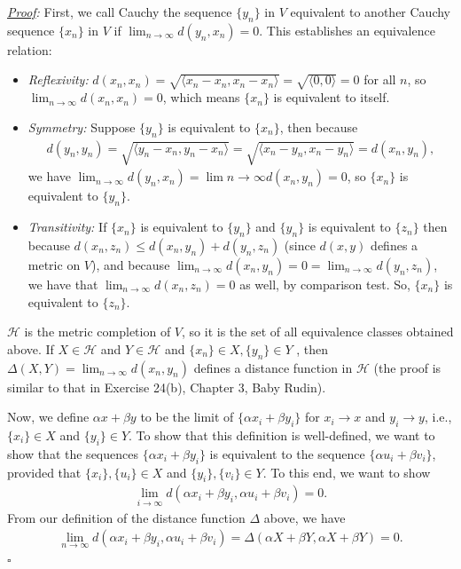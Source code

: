 \documentclass[11pt]{article}
\begin{document}
\begin{enumerate}[(a)]
\begin{itemize}
		
		\noindent \textit{\underline{Proof}:} First, we call Cauchy the sequence $\{y_n\}$ in $V$ equivalent to another Cauchy sequence $\{x_n\}$ in $V$ if $ \lim_{n\to \infty}d(y_n,x_n) =0$. This establishes an equivalence relation:
		\begin{itemize}
			\item \textit{Reflexivity:} $d(x_n,x_n) = \sqrt{\langle x_n-x_n,x_n-x_n\rangle} = \sqrt{\langle 0,0 \rangle} =0$ for all $n$, so $\lim_{n\to \infty} d(x_n,x_n) = 0$, which means $\{x_n\}$ is equivalent to itself. 
			\item \textit{Symmetry:} Suppose $\{y_n\}$ is equivalent to $\{x_n\}$, then because 
			\begin{align*}
			d(y_n,y_n) = \sqrt{\langle y_n -x_n, y_n-x_n\rangle} = \sqrt{\langle x_n-y_n, x_n-y_n \rangle} = d(x_n,y_n),
			\end{align*}
			we have $\lim_{n\to \infty} d(y_n,x_n) = \lim{n\to \infty} d(x_n,y_n) = 0$, so $\{x_n\}$ is equivalent to $\{y_n\}$. 
			\item \textit{Transitivity:} If $\{x_n\}$ is equivalent to $\{y_n\}$ and $\{y_n\}$ is equivalent to $\{z_n\}$ then because $
			d(x_n,z_n) \leq d(x_n,y_n) + d(y_n , z_n)$
			(since $d(x,y)$ defines a metric on $V$), and because $\lim_{n\to \infty}d(x_n,y_n) = 0 = \lim_{n\to\infty}d(y_n,z_n)$, we have that $\lim_{n\to \infty}d(x_n,z_n) = 0$ as well, by comparison test. So, $\{x_n\}$ is equivalent to $\{z_n\}$.   
		\end{itemize}
		$\mathcal{H}$ is the metric completion of $V$, so it is the set of all equivalence classes obtained above. If $X \in \mathcal{H}$ and $Y\in \mathcal{H}$ and $\{x_n\} \in X, \{y_n\}\in Y$ , then $
		\Delta (X,Y) = \lim_{n\to \infty}d(x_n,y_n)$ defines a distance function in $\mathcal{H}$ (the proof is similar to that in Exercise 24(b), Chapter 3, Baby Rudin).
		
		Now, we define $\alpha x + \beta y$ to be the limit of $\{\alpha x_i + \beta y_i\}$ for $x_i \to x$ and $y_i \to y$, i.e., $\{x_i\}\in X$ and $\{ y_i\} \in Y$. To show that this definition is well-defined, we want to show that the sequences $\{\alpha x_i + \beta y_i\}$ is equivalent to the sequence $\{ \alpha u_i + \beta v_i \}$, provided that $\{x_i\}, \{u_i\} \in X$ and $\{y_i\}, \{v_i\} \in Y$. To this end, we want to show 
		\begin{align*}
		\lim_{i\to\infty} d(\alpha x_i + \beta y_i , \alpha u_i + \beta v_i) = 0.
		\end{align*}
		From our definition of the distance function $\Delta$ above, we have
		\begin{align*}
		\lim_{n\to \infty}d(\alpha x_i + \beta y_i, \alpha u_i + \beta v_i) = \Delta(\alpha X + \beta Y, \alpha X + \beta Y) = 0.
		\end{align*}
		\hfill$\square$ 
		

\end{itemize}
\end{enumerate}
\end{document}
